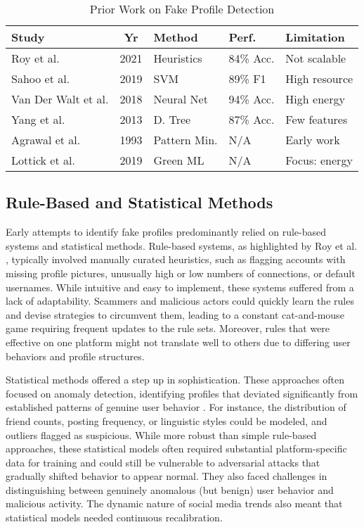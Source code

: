 \documentclass[conference]{IEEEtran}
\begin{document}
\begin{table}[htbp]
\small
\caption{Prior Work on Fake Profile Detection}
\begin{center}
\begin{tabular}{|l|c|l|l|l|}
\hline
\textbf{Study} & \textbf{Yr} & \textbf{Method} & \textbf{Perf.} & \textbf{Limitation} \\
\hline
Roy et al. \cite{b1} & 2021 & Heuristics & 84\% Acc. & Not scalable \\
Sahoo et al. \cite{b3} & 2019 & SVM & 89\% F1 & High resource \\
Van Der Walt et al. \cite{b6} & 2018 & Neural Net & 94\% Acc. & High energy \\
Yang et al. \cite{b7} & 2013 & D. Tree & 87\% Acc. & Few features \\
Agrawal et al. \cite{b10} & 1993 & Pattern Min. & N/A & Early work \\
Lottick et al. \cite{b11} & 2019 & Green ML & N/A & Focus: energy \\
\hline
\end{tabular}
\label{tab:lit}
\end{center}
\end{table}

\subsection{Rule-Based and Statistical Methods}
Early attempts to identify fake profiles predominantly relied on rule-based systems and statistical methods. Rule-based systems, as highlighted by Roy et al. \cite{b1}, typically involved manually curated heuristics, such as flagging accounts with missing profile pictures, unusually high or low numbers of connections, or default usernames. While intuitive and easy to implement, these systems suffered from a lack of adaptability. Scammers and malicious actors could quickly learn the rules and devise strategies to circumvent them, leading to a constant cat-and-mouse game requiring frequent updates to the rule sets. Moreover, rules that were effective on one platform might not translate well to others due to differing user behaviors and profile structures.

Statistical methods offered a step up in sophistication. These approaches often focused on anomaly detection, identifying profiles that deviated significantly from established patterns of genuine user behavior \cite{b9}. For instance, the distribution of friend counts, posting frequency, or linguistic styles could be modeled, and outliers flagged as suspicious. While more robust than simple rule-based approaches, these statistical models often required substantial platform-specific data for training and could still be vulnerable to adversarial attacks that gradually shifted behavior to appear normal. They also faced challenges in distinguishing between genuinely anomalous (but benign) user behavior and malicious activity. The dynamic nature of social media trends also meant that statistical models needed continuous recalibration.
\end{document}
